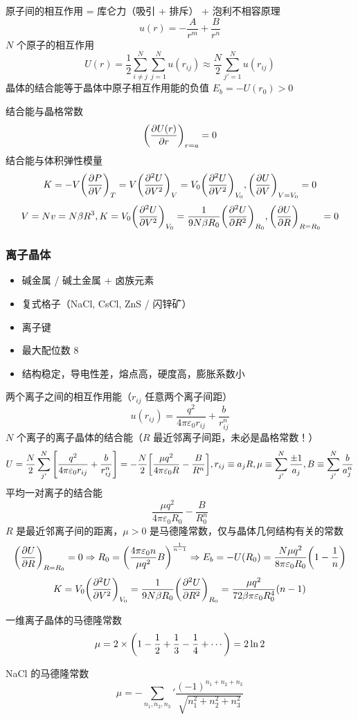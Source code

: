 原子间的相互作用 = 库仑力（吸引 + 排斥） + 泡利不相容原理
\[ u(r) = - \frac{A}{r^{m}} + \frac{B}{r^{n}} \]
$N$ 个原子的相互作用
\[ U(r) = \frac{1}{2} \sum^{N}_{i \neq j} \sum^{N}_{j = 1} u(r_{i j}) \approx \frac{N}{2} \sum^{N}_{j' = 1} u(r_{i j}) \]
晶体的结合能等于晶体中原子相互作用能的负值 $E_b = - U(r_0) > 0$

结合能与晶格常数
\[ \qty(\pdv{U(r)}{r})_{r = a} = 0 \]
结合能与体积弹性模量
\[ K = - V \qty(\pdv{P}{V})_{T} = V \qty(\pdv[2]{U}{V})_V = V_0 \qty(\pdv[2]{U}{V})_{V_0}, \qty(\pdv{U}{V})_{V = V_0} = 0 \]
\[ V = N v = N \beta R^3, K = V_0 \qty(\pdv[2]{U}{V})_{V_0} = \frac{1}{9 N \beta R_0} \qty(\pdv[2]{U}{R})_{R_0}, \qty(\pdv{U}{R})_{R = R_0} = 0 \]

\subsubsection{离子晶体}

\begin{itemize}
    \item 碱金属 / 碱土金属 + 卤族元素
    \item 复式格子（NaCl, CsCl, ZnS / 闪锌矿）
    \item 离子键
    \item 最大配位数 8
    \item 结构稳定，导电性差，熔点高，硬度高，膨胀系数小
\end{itemize}

两个离子之间的相互作用能（$r_{ij}$ 任意两个离子间距）
\[ u(r_{i j}) = \frac{q^2}{4 \pi \varepsilon_0 r_{i j}} + \frac{b}{r_{i j}^n} \]
$N$ 个离子的离子晶体的结合能（$R$ 最近邻离子间距，未必是晶格常数！）
\[ U = \frac{N}{2} \sum^{N}_{j'} \qty[\frac{q^2}{4 \pi \varepsilon_0 r_{i j}} + \frac{b}{r_{i j}^n}] = - \frac{N}{2} \qty[\frac{\mu q^2}{4 \pi \varepsilon_0 R} - \frac{B}{R^n}], r_{i j} \equiv a_j R, \mu \equiv \sum^{N}_{j'} \frac{\pm 1}{a_j}, B \equiv \sum^{N}_{j'} \frac{b}{a^n_j} \]
平均一对离子的结合能
\[ \frac{\mu q^2}{4 \pi \varepsilon_0 R_0} - \frac{B}{R_0^n} \]
$R$ 是最近邻离子间的距离，$\mu > 0$ 是马德隆常数，仅与晶体几何结构有关的常数
\[ \qty(\pdv{U}{R})_{R = R_0} = 0 \Rightarrow R_0 = \qty(\frac{4 \pi \varepsilon_0 n}{\mu q^2} B)^{\frac{1}{n-1}} \Rightarrow E_b = - U(R_0) = \frac{N \mu q^2}{8 \pi \varepsilon_0 R_0} \qty(1 - \frac{1}{n}) \]
\[ K = V_0 \qty(\pdv[2]{U}{V})_{V_0} = \frac{1}{9 N \beta R_0} \qty(\pdv[2]{U}{R})_{R_0} = \frac{\mu q^2}{72 \beta \pi \varepsilon_0 R_0^4} (n - 1) \]

\begin{framed}
    一维离子晶体的马德隆常数
    \[ \mu = 2 \times \qty(1 - \frac{1}{2} + \frac{1}{3} - \frac{1}{4} + \cdots) = 2 \ln 2 \]

    NaCl 的马德隆常数
    \[ \mu = - \sum_{n_1, n_2, n_3}' \frac{(-1)^{n_1 + n_2 + n_3}}{\sqrt{n_1^2 + n_2^2 + n_3^2}} \]
\end{framed}

